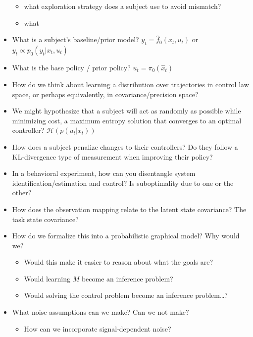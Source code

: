 \documentclass[
  a4paper,
]{article}
\providecommand{\tightlist}{%
  \setlength{\itemsep}{0pt}\setlength{\parskip}{0pt}}
\begin{document}
\begin{itemize}
  \begin{itemize}
  \tightlist
  \item
    what exploration strategy does a subject use to avoid mismatch?
  \item
    what
  \end{itemize}
\item
  What is a subject's baseline/prior model?
  \(y_{t} = \hat{f}_0(x_t,u_t)\) or \(y_{t} \propto p_0(y_t|x_{t},u_t)\)
\item
  What is the base policy / prior policy? \(u_t = \pi_0(\hat{x}_t)\)
\item
  How do we think about learning a distribution over trajectories in
  control law space, or perhaps equivalently, in covariance/precision
  space?
\item
  We might hypothesize that a subject will act as randomly as possible
  while minimizing cost, a maximum entropy solution that converges to an
  optimal controller? \(\mathcal{H}(p(u_t|x_t))\)
\item
  How does a subject penalize changes to their controllers? Do they
  follow a KL-divergence type of measurement when improving their
  policy?
\item
  In a behavioral experiment, how can you disentangle system
  identification/estimation and control? Is suboptimality due to one or
  the other?
\item
  How does the observation mapping relate to the latent state
  covariance? The task state covariance?
\item
  How do we formalize this into a probabilistic graphical model? Why
  would we?

  \begin{itemize}
  \tightlist
  \item
    Would this make it easier to reason about what the goals are?
  \item
    Would learning \(M\) become an inference problem?
  \item
    Would solving the control problem become an inference problem\ldots?
  \end{itemize}
\item
  What noise assumptions can we make? Can we not make?

  \begin{itemize}
  \tightlist
  \item
    How can we incorporate signal-dependent noise?
  \end{itemize}
\end{itemize}
\end{document}
